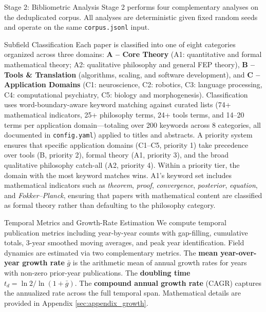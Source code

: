 \documentclass[
  ignorenonframetext,
]{beamer}
\author{\texorpdfstring{}{}}
\date{}
\begin{document}
\begin{frame}{Stage 2: Bibliometric Analysis
\label{sec:methods_bibliometrics}}
\protect{}\label{stage-2-bibliometric-analysis}
Stage 2 performs four complementary analyses on the deduplicated corpus.
All analyses are deterministic given fixed random seeds and operate on
the same \texttt{corpus.jsonl} input.

\begin{block}{Subfield Classification}
\protect{}\label{subfield-classification}
Each paper is classified into one of eight categories organized across
three domains: \textbf{A -- Core Theory} (A1: quantitative and formal
mathematical theory; A2: qualitative philosophy and general FEP theory),
\textbf{B -- Tools \& Translation} (algorithms, scaling, and software
development), and \textbf{C -- Application Domains} (C1: neuroscience,
C2: robotics, C3: language processing, C4: computational psychiatry, C5:
biology and morphogenesis). Classification uses word-boundary-aware
keyword matching against curated lists (74+ mathematical indicators, 25+
philosophy terms, 24+ tools terms, and 14--20 terms per application
domain---totaling over 200 keywords across 8 categories, all documented
in \texttt{config.yaml}) applied to titles and abstracts. A priority
system ensures that specific application domains (C1--C5, priority 1)
take precedence over tools (B, priority 2), formal theory (A1, priority
3), and the broad qualitative philosophy catch-all (A2, priority 4).
Within a priority tier, the domain with the most keyword matches wins.
A1's keyword set includes mathematical indicators such as
\emph{theorem}, \emph{proof}, \emph{convergence}, \emph{posterior},
\emph{equation}, and \emph{Fokker--Planck}, ensuring that papers with
mathematical content are classified as formal theory rather than
defaulting to the philosophy category.
\end{block}

\begin{block}{Temporal Metrics and Growth-Rate Estimation}
\protect{}\label{temporal-metrics-and-growth-rate-estimation}
We compute temporal publication metrics including year-by-year counts
with gap-filling, cumulative totals, 3-year smoothed moving averages,
and peak year identification. Field dynamics are estimated via two
complementary metrics. The \textbf{mean year-over-year growth rate}
\(\bar{g}\) is the arithmetic mean of annual growth rates for years with
non-zero prior-year publications. The \textbf{doubling time}
\(t_d = \ln 2 / \ln(1 + \bar{g})\). The \textbf{compound annual growth
rate} (CAGR) captures the annualized rate across the full temporal span.
Mathematical details are provided in Appendix \ref{sec:appendix_growth}.
\end{block}


\end{frame}
\end{document}
